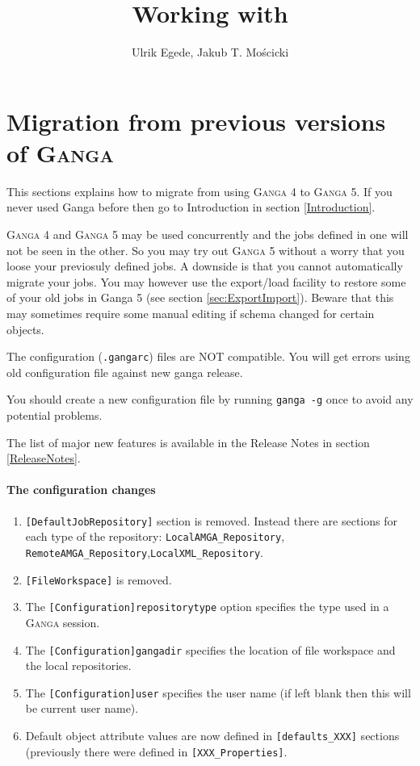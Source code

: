 \documentclass{howto}
\title{Working with \ganga \totalv}
\author{Ulrik Egede, Jakub T. Mo\'scicki}
\def\ganga {\textsc{Ganga}\xspace}
\begin{document}
\maketitle
\tableofcontents

\section{Migration from previous versions of \ganga}
\label{sec:migration}
This sections explains how to migrate from using \ganga 4 to \ganga 5. 
If you never used Ganga before then go to Introduction in section \ref{Introduction}.

\ganga 4 and \ganga 5 may be used concurrently and the jobs defined in
one will not be seen in the other. So you may try out \ganga 5 without
a worry that you loose your previosuly defined jobs. A downside is
that you cannot automatically migrate your jobs. You may however use
the export/load facility to restore some of your old jobs in Ganga 5
(see section \ref{sec:ExportImport}). Beware that this may sometimes 
require some manual editing if schema changed for certain objects.


\begin{notice}
The configuration (\texttt{.gangarc}) files are NOT compatible. You will get errors
using old configuration file against new ganga release.

You should create a new configuration file by running \texttt{ganga -g} 
once to avoid any potential problems. 

\end{notice}


The list of major new features is available in the Release Notes in section \ref{ReleaseNotes}.

\paragraph{The configuration changes}

\begin{enumerate}
\item \texttt{[DefaultJobRepository]} section is removed. Instead there are sections for each type of the repository: \texttt{LocalAMGA_Repository}, \texttt{RemoteAMGA_Repository},\texttt{LocalXML_Repository}.
\item  \texttt{[FileWorkspace]} is removed.
\item The \texttt{[Configuration]repositorytype} option specifies the type used in a \ganga session. 
\item The \texttt{[Configuration]gangadir} specifies the location of file workspace and the local repositories.
\item The \texttt{[Configuration]user} specifies the user name (if left blank then this will be current user name).
\item Default object attribute values are now defined in \texttt{[defaults_XXX]} sections (previously there were defined in \texttt{[XXX_Properties]}.
\end{enumerate}
\end{document}
